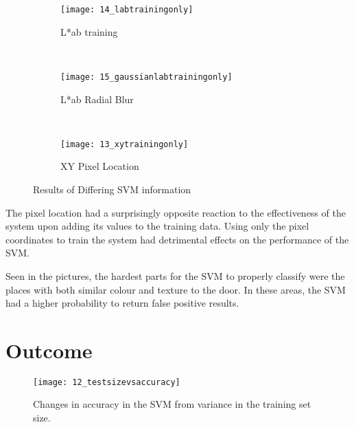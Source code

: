 \begin{figure}
        \centering
        \begin{subfigure}[b]{0.3\textwidth}
                \centering
                \texttt{[image: 14\_labtrainingonly]}
                \caption{L*ab training}
                \label{fig:14_labtrainingonly}
        \end{subfigure}%
        ~ %
        \begin{subfigure}[b]{0.3\textwidth}
                \centering
                \texttt{[image: 15\_gaussianlabtrainingonly]}
                \caption{L*ab Radial Blur}
                \label{fig:15_gaussianlabtrainingonly}
        \end{subfigure}
        ~ %
        \begin{subfigure}[b]{0.3\textwidth}
                \centering
                \texttt{[image: 13\_xytrainingonly]}
                \caption{XY Pixel Location}
                \label{fig:13_xytrainingonly}
        \end{subfigure}
        \caption{Results of Differing SVM information}\label{fig:animals}
\end{figure}
The pixel location had a surprisingly opposite reaction to the effectiveness of the system upon adding its values to the training data. Using only the pixel coordinates to train the system had detrimental effects on the performance of the SVM. 

Seen in the pictures, the hardest parts for the SVM to properly classify were the places with both similar colour and texture to the door. In these areas, the SVM had a higher probability to return false positive results.

\newpage

\section{Outcome}

\begin{figure}[ht]
    \centering
    \texttt{[image: 12\_testsizevsaccuracy]}
    \caption{Changes in accuracy in the SVM from variance in the training set size.}
    \label{fig:12_testsizevsaccuracy}
\end{figure}

